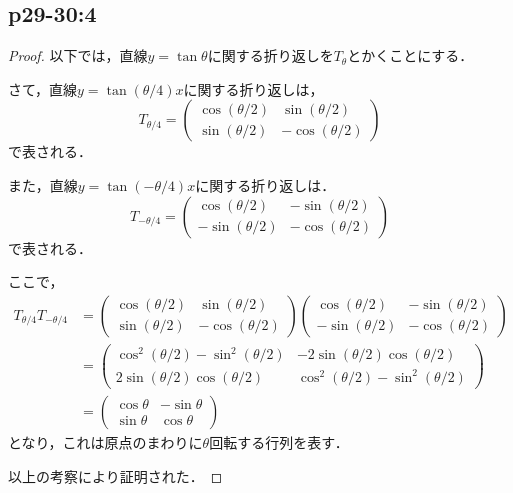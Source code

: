 \documentclass[uplatex,dvipdfmx,a4paper,10pt,fleqn]{jsarticle}
\begin{document}
\subsection*{p29-30:4}

\begin{tleftbar}
    \begin{proof}
        以下では，直線$y= \tan \theta$に関する折り返しを$T_{\theta}$とかくことにする．

        さて，直線$ y = \tan (\theta /4) x$に関する折り返しは，
        \[
            T_{\theta/4} = \begin{pmatrix} \cos (\theta /2) & \sin (\theta /2) \\  \sin (\theta /2) & -\cos (\theta /2) \end{pmatrix}
        \]
        で表される．

        また，直線$y = \tan (-\theta /4)x$に関する折り返しは．
        \[
            T_{-\theta/4} = \begin{pmatrix} \cos (\theta /2) & -\sin (\theta/2) \\ -\sin (\theta/2) & -\cos (\theta /2) \end{pmatrix}
        \]
        で表される．

        ここで，
        \begin{align*} 
            T_{\theta/4} T_{-\theta/4} & = \begin{pmatrix} \cos (\theta /2) & \sin (\theta /2) \\  \sin (\theta /2) & -\cos (\theta /2) \end{pmatrix} \begin{pmatrix} \cos (\theta /2) & -\sin (\theta/2) \\ -\sin (\theta/2) & -\cos (\theta /2) \end{pmatrix} \\
            & =\begin{pmatrix} \cos ^2 (\theta /2)-\sin ^2 (\theta/2) & -2\sin (\theta/2) \cos (\theta/2) \\ 2\sin (\theta/2) \cos (\theta/2) & \cos ^2 (\theta/2)-\sin ^2 (\theta/2) \end{pmatrix} \\
            & = \begin{pmatrix} \cos \theta & -\sin \theta \\ \sin \theta & \cos \theta \end{pmatrix}
        \end{align*} 
        となり，これは原点のまわりに$\theta$回転する行列を表す．

        以上の考察により証明された．
    \end{proof}
\end{tleftbar}
\end{document}
